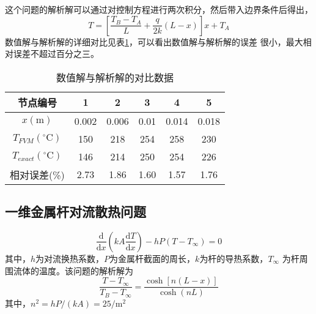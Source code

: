 这个问题的解析解可以通过对控制方程进行两次积分，然后带入边界条件后得出，
\begin{equation}
  T 
  =
  \left[
    \frac{T_{B}-T_{A}}{L}
    +
    \frac{q}{2k}(L-x)
  \right]x
  +
  T_{A}
\end{equation}
数值解与解析解的详细对比见表\ref{TbFV_ex2_compare}，可以看出数值解与解析解的误差
很小，最大相对误差不超过百分之三。
\begin{table}[H]
  \begin{center}
  \caption{数值解与解析解的对比数据}
  \label{TbFV_ex2_compare}
  \begin{tabular}{|c|c|c|c|c|c|}
    \hline
    节点编号 & 1 & 2 & 3 & 4 & 5 \\
    \hline
    $x(\mathrm{m})$ & 0.002 & 0.006 & 0.01 & 0.014 & 0.018 \\
    \hline
    $T_{FVM}(^{\circ}\mathrm{C})$ & 150 & 218 & 254 & 258 & 230 \\
    \hline
    $T_{exact}(^{\circ}\mathrm{C})$ & 146 & 214 & 250 & 254 & 226 \\
    \hline
    相对误差(\%) & 2.73 & 1.86 & 1.60 & 1.57 & 1.76 \\
    \hline
  \end{tabular}
  \end{center}
\end{table}

\subsection{一维金属杆对流散热问题}

\begin{equation}
  \frac{\mathrm{d}}{\mathrm{d}x}
  \left(
    kA\frac{\mathrm{d}T}{\mathrm{d}x}
  \right)
  -
  hP(T-T_{\infty})
  =
  0
\end{equation}
其中，$h$为对流换热系数，$P$为金属杆截面的周长，$k$为杆的导热系数，$T_{\infty}$
为杆周围流体的温度。该问题的解析解为
\begin{equation}
  \frac{T-T_{\infty}}{T_{B}-T_{\infty}}
  =
  \frac{\cosh{[n(L-x)]}}{\cosh{(nL)}}
\end{equation}
其中，$n^{2}=hP/(kA)=25/{\mathrm{m^{2}}}$

